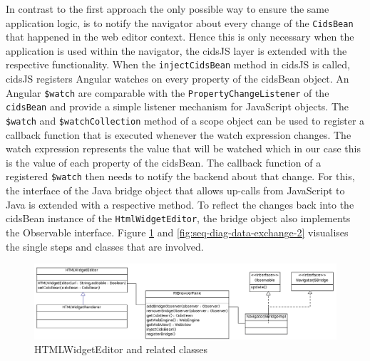In contrast to the first approach the only possible way to ensure the same application logic, is to notify the navigator about every change of the \texttt{CidsBean} that happened in the web editor context.
Hence this is only necessary when the application is used within the navigator, the cidsJS layer is extended with the respective functionality.
When the \texttt{injectCidsBean} method in cidsJS is called, cidsJS registers Angular watches on every property of the cidsBean object.
An Angular \texttt{\$watch} are comparable with the \texttt{PropertyChangeListener} of the \texttt{cidsBean} and provide a simple listener mechanism for JavaScript objects.
The \texttt{\$watch} and \texttt{\$watchCollection} method of a scope object can be used to register a callback function that is executed whenever the watch expression changes.
The watch expression represents the value that will be watched which in our case this  is the value of each property of the cidsBean. 
The callback function of a registered  \texttt{\$watch} then needs to notify the backend about that change.
For this, the interface of the Java bridge object that allows up-calls from JavaScript to Java is extended with a respective method.
To reflect the changes back into the cidsBean instance of the \texttt{HtmlWidgetEditor}, the bridge object also implements the Observable interface. Figure \ref{fig:class_diag_html_widget_editor} and \ref{fig:seq-diag-data-exchange-2} visualises the single steps and classes that are involved.

\begin{figure}
	\centering	\includegraphics[width=1.0\textwidth]{./img/classDiagramms/html_editor.png}
	\caption{HTMLWidgetEditor and related classes}
	\label{fig:class_diag_html_widget_editor}
\end{figure}


